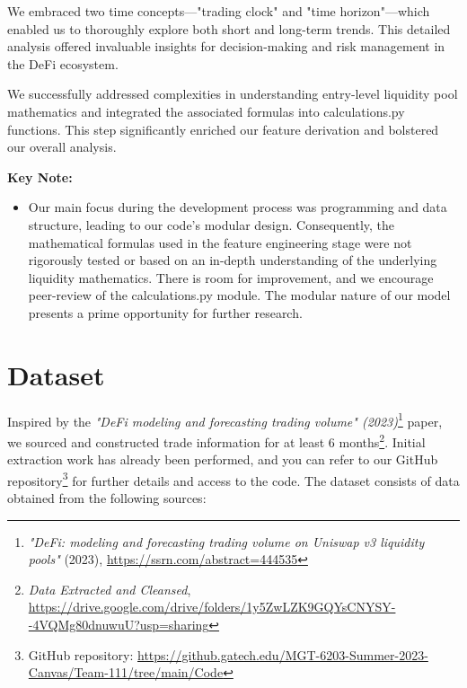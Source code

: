 \documentclass{article}
\begin{document}
{We embraced two time concepts—"trading clock" and "time horizon"—which enabled us to thoroughly explore both short and long-term trends. This detailed analysis offered invaluable insights for decision-making and risk management in the DeFi ecosystem.

We successfully addressed complexities in understanding entry-level liquidity pool mathematics and integrated the associated formulas into calculations.py functions. This step significantly enriched our feature derivation and bolstered our overall analysis.

\textbf{Key Note:}
\begin{itemize}
\item Our main focus during the development process was programming and data structure, leading to our code's modular design. Consequently, the mathematical formulas used in the feature engineering stage were not rigorously tested or based on an in-depth understanding of the underlying liquidity mathematics. There is room for improvement, and we encourage peer-review of the calculations.py module. The modular nature of our model presents a prime opportunity for further research.
\end{itemize}



\section*{Dataset}

Inspired by the \textit{"DeFi modeling and forecasting trading volume" (2023)}\footnote{\textit{"DeFi: modeling and forecasting trading volume on Uniswap v3 liquidity pools"} (2023), \url{https://ssrn.com/abstract=444535}} paper, we sourced and constructed trade information for at least 6 months\footnote{\textit{Data Extracted and Cleansed}, \url{https://drive.google.com/drive/folders/1y5ZwLZK9GQYsCNYSY--4VQMg80dnuwuU?usp=sharing}}. Initial extraction work has already been performed, and you can refer to our GitHub repository\footnote{GitHub repository: \url{https://github.gatech.edu/MGT-6203-Summer-2023-Canvas/Team-111/tree/main/Code}} for further details and access to the code. The dataset consists of data obtained from the following sources:

}
\end{document}
